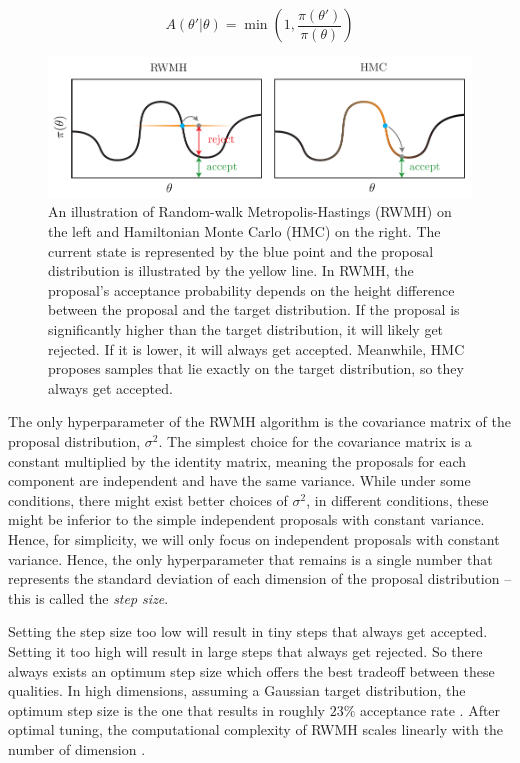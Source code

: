 \documentclass[12pt]{article}
\begin{document}
{\begin{equation}
A(\theta'|\theta) = \min \left(1, \frac{\pi(\theta')}{\pi(\theta)} \right)
\label{eq_rwmh_accept_prob}
\end{equation}

\begin{figure}[H]
\centering
\includegraphics[width=14cm]{illustrations/rwmh_vs_hmc.pdf}
\caption{An illustration of Random-walk Metropolis-Hastings (RWMH) on the left and Hamiltonian Monte Carlo (HMC) on the right. The current state is represented by the blue point and the proposal distribution is illustrated by the yellow line. In RWMH, the proposal's acceptance probability depends on the height difference between the proposal and the target distribution. If the proposal is significantly higher than the target distribution, it will likely get rejected. If it is lower, it will always get accepted. Meanwhile, HMC proposes samples that lie exactly on the target distribution, so they always get accepted.}
\label{fig_rwmh_vs_hmc}
\end{figure}

The only hyperparameter of the RWMH algorithm is the covariance matrix of the proposal distribution, $\sigma^2$. The simplest choice for the covariance matrix is a constant multiplied by the identity matrix, meaning the proposals for each component are independent and have the same variance. While under some conditions, there might exist better choices of $\sigma^2$, in different conditions, these might be inferior to the simple independent proposals with constant variance. Hence, for simplicity, we will only focus on independent proposals with constant variance. Hence, the only hyperparameter that remains is a single number that represents the standard deviation of each dimension of the proposal distribution -- this is called the \textit{step size}.

Setting the step size too low will result in tiny steps that always get accepted. Setting it too high will result in large steps that always get rejected. So there always exists an optimum step size which offers the best tradeoff between these qualities. In high dimensions, assuming a Gaussian target distribution, the optimum step size is the one that results in roughly $23\%$ acceptance rate \cite{rwmh_accept_rate}. After optimal tuning, the computational complexity of RWMH scales linearly with the number of dimension \cite{hmc_rwmh_scaling}.

}
\end{document}
